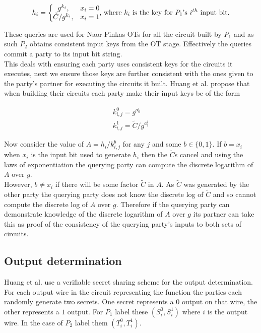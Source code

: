 \documentclass[ %
                    author={Nicholas Tutte},
                supervisor={Prof. Nigel Smart},
                    degree={MEng},
                     title={Secure Two Party Computation},
                  subtitle={A practical comparison of recent protocols},
                      type={Research - GG1K},
                      year={2015} ]{dissertation}
\begin{document}
				$$
				h_i = \bigg\{
					\begin{matrix}
						g^{k_i}, & x_i = 0\\
						\tilde C / g^{k_i}, & x_i = 1
					\end{matrix}
					\textnormal{,  where } k_i \textnormal{ is the key for } P_1 \textnormal{'s } i^{th} \textnormal{ input bit.}
				$$

				These queries are used for Naor-Pinkas OTs for all the circuit built by $P_1$ and as such $P_2$ obtains consistent input keys from the OT stage. Effectively the queries commit a party to its input bit string.\\

				This deals with ensuring each party uses consistent keys for the circuits it executes, next we ensure those keys are further consistent with the ones given to the party's partner for executing the circuits it built. Huang et al. propose that when building their circuits each party make their input keys be of the form
				
				$$
				\begin{matrix}
					k_{i,j}^0 = g^{a_0^i}\\
					k_{i,j}^1 = \tilde C / g^{a_1^i}
				\end{matrix}
				$$

				Now consider the value of $A = h_i / k_{i,j}^{b}$ for any $j$ and some $b \in \{0, 1\}$. If $b = x_i$ when $x_i$ is the input bit used to generate $h_i$ then the $\tilde C$s cancel and using the laws of exponentiation the querying party can compute the discrete logarithm of $A$ over $g$.\\

				However, $b \neq x_i$ if there will be some factor $\tilde C$ in $A$. As $\tilde C$ was generated by the other party the querying party does not know the discrete log of $\tilde C$ and so cannot compute the discrete log of $A$ over $g$. Therefore if the querying party can demonstrate knowledge of the discrete logarithm of $A$ over $g$ its partner can take this as proof of the consistency of the querying party's inputs to both sets of circuits.

			\subsection{Output determination}
				Huang et al. use a verifiable secret sharing scheme for the output determination. For each output wire in the circuit representing the function the parties each randomly generate two secrets. One secret represents a $0$ output on that wire, the other represents a $1$ output. For $P_1$ label these $(S_i^0, S_i^1)$ where $i$ is the output wire. In the case of $P_2$ label them $(T_i^0, T_i^1)$.\\
\end{document}
